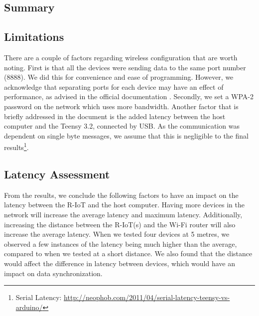 \subsection{Summary}

\subsection*{Limitations}
\label{subsec:latency_limitations}
There are a couple of factors regarding wireless configuration that are worth noting. First is that all the devices were sending data to the same port number (8888). We did this for convenience and ease of programming. However, we acknowledge that separating ports for each device may have an effect of performance, as advised in the official documentation \cite{noauthor_bitalino_nodate}. Secondly, we set a WPA-2 password on the network which uses more bandwidth. Another factor that is briefly addressed in the document is the added latency between the host computer and the Teensy 3.2, connected by USB. As the communication was dependent on single byte messages, we assume that this is negligible to the final results\footnote{Serial Latency: \url{http://neophob.com/2011/04/serial-latency-teensy-vs-arduino/}}.

\subsection*{Latency Assessment}

From the results, we conclude the following factors to have an impact on the latency between the R-IoT and the host computer. Having more devices in the network will increase the average latency and maximum latency. Additionally, increasing the distance between the R-IoT(s) and the Wi-Fi router will also increase the average latency. When we tested four devices at 5 metres, we observed a few instances of the latency being much higher than the average, compared to when we tested at a short distance. We also found that the distance would affect the difference in latency between devices, which would have an impact on data synchronization.
